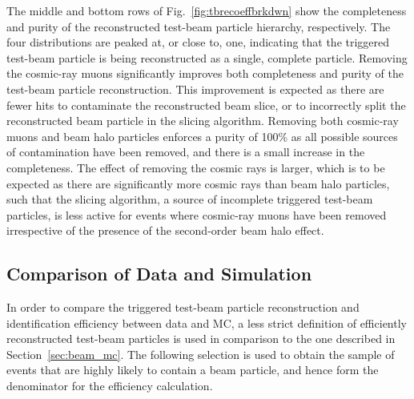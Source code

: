 \documentclass[epjc3]{svjour3}
\begin{document}
The middle and bottom rows of Fig.~\ref{fig:tbrecoeffbrkdwn} show the completeness and purity of the reconstructed test-beam particle hierarchy, respectively. The four distributions are peaked at, or close to, one, indicating that the triggered test-beam particle is being reconstructed as a single, complete particle. Removing the cosmic-ray muons significantly improves both completeness and purity of the test-beam particle reconstruction. This improvement is expected as there are fewer hits to contaminate the reconstructed beam slice, or to incorrectly split the reconstructed beam particle in the slicing algorithm. Removing both cosmic-ray muons and beam halo particles enforces a purity of 100\% as all possible sources of contamination have been removed, and there is a small increase in the completeness. The effect of removing the cosmic rays is larger, which is to be expected as there are significantly more cosmic rays than beam halo particles, such that the slicing algorithm, a source of incomplete triggered test-beam particles, is less active for events where cosmic-ray muons have been removed irrespective of the presence of the second-order beam halo effect.

\subsection{Comparison of Data and Simulation}
\label{sec:data}

In order to compare the triggered test-beam particle reconstruction and identification efficiency between data and MC, a less strict definition of efficiently reconstructed test-beam particles is used in comparison to the one described in Section~\ref{sec:beam_mc}. The following selection is used to obtain the sample of events that are highly likely to contain a beam particle, and hence form the denominator for the efficiency calculation.
\end{document}
